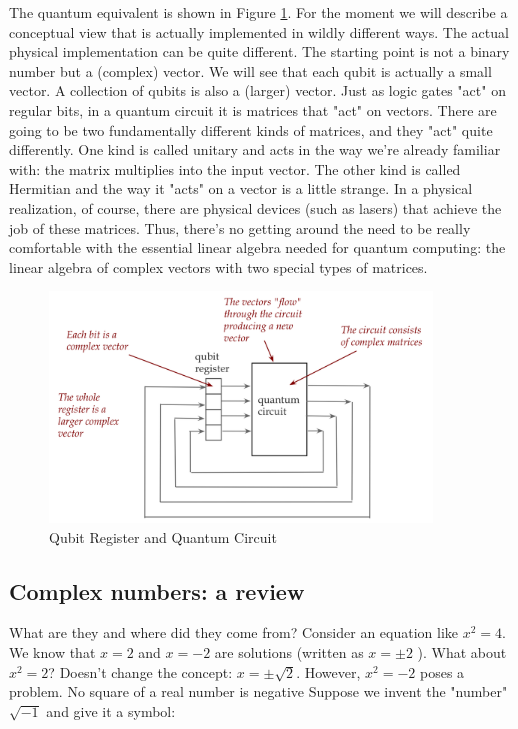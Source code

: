 \documentclass[main.tex]{subfiles}
\begin{document}
    The quantum equivalent is shown in Figure \ref{fig:02circuit2}. For the moment we will describe a conceptual view that is actually implemented in wildly different ways. The actual physical implementation can be quite different. The starting point is not a binary number but a (complex) vector. We will see that each qubit is actually a small vector. A collection of qubits is also a (larger) vector. Just as logic gates "act" on regular bits, in a quantum circuit it is matrices that "act" on vectors. There are going to be two fundamentally different kinds of matrices, and they "act" quite differently. One kind is called unitary and acts in the way we're already familiar with: the matrix multiplies into the input vector. The other kind is called Hermitian and the way it "acts" on a vector is a little strange. In a physical realization, of course, there are physical devices (such as lasers) that achieve the job of these matrices. Thus, there's no getting around the need to be really comfortable with the essential linear algebra needed for quantum computing: the linear algebra of complex vectors with two special types of matrices.
    
    \begin{figure}
        \centering
        \includegraphics[width=4in]{notes/figs/n04/02circuit2.png}
        \caption{Qubit Register and Quantum Circuit}
        \label{fig:02circuit2}
    \end{figure}

\subsection{Complex numbers: a review}

    What are they and where did they come from? Consider an equation like $x^{2}=4$. We know that $x=2$ and $x=-2$ are solutions (written as $x=\pm 2$ ). What about $x^{2}=2$? Doesn't change the concept: $x=\pm \sqrt{2}$. However, $x^{2}=-2$ poses a problem. No square of a real number is negative Suppose we invent the "number" $\sqrt{-1}$ and give it a symbol:
    
\end{document}

